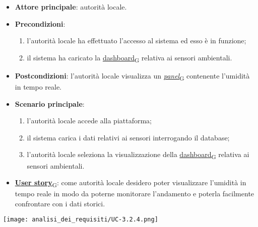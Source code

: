 \begin{itemize}
	\item \textbf{Attore principale}: autorità locale.
	\item \textbf{Precondizioni}:
	      \begin{enumerate}
		      \item l'autorità locale ha effettuato l'accesso al sistema ed esso è in funzione;
		      \item il sistema ha caricato la \href{https://7last.github.io/docs/pb/documentazione-interna/glossario\#dashboard}{dashboard\textsubscript{G}} relativa ai sensori ambientali.
	      \end{enumerate}
	\item \textbf{Postcondizioni}: l'autorità locale visualizza un \href{https://7last.github.io/docs/pb/documentazione-interna/glossario\#panel}{\textit{panel}\textsubscript{G}} contenente l'umidità in tempo reale.
	\item \textbf{Scenario principale}:
	      \begin{enumerate}
		      \item l'autorità locale accede alla piattaforma;
		      \item il sistema carica i dati relativi ai sensori interrogando il database;
		      \item l'autorità locale seleziona la visualizzazione della \href{https://7last.github.io/docs/pb/documentazione-interna/glossario\#dashboard}{dashboard\textsubscript{G}} relativa ai sensori ambientali.
	      \end{enumerate}
	\item \href{https://7last.github.io/docs/pb/documentazione-interna/glossario\#user-story}{\textbf{User story}\textsubscript{G}}:
	      come autorità locale desidero poter visualizzare l'umidità in tempo reale in modo da poterne monitorare l'andamento
	      e poterla facilmente confrontare con i dati storici.
\end{itemize}
\begin{center}
	\texttt{[image: analisi\_dei\_requisiti/UC-3.2.4.png]}
\end{center}


